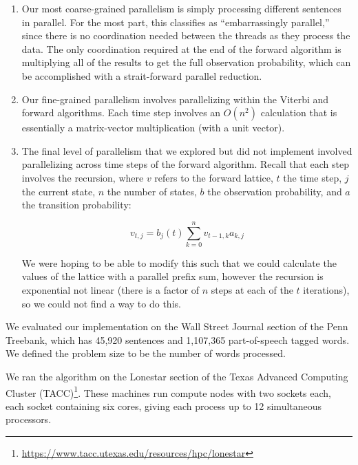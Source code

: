 \documentclass[11pt,onecolumn]{article}
\begin{document}
\begin{enumerate}
  \item Our most coarse-grained parallelism is simply processing different sentences in parallel. For the most part, this classifies as ``embarrassingly parallel,'' since there is no coordination needed between the threads as they process the data. The only coordination required at the end of the forward algorithm is multiplying all of the results to get the full observation probability, which can be accomplished with a strait-forward parallel reduction.

  \item Our fine-grained parallelism involves parallelizing within the Viterbi and forward algorithms. Each time step involves an $O(n^2)$ calculation that is essentially a matrix-vector multiplication (with a unit vector).

\item The final level of parallelism that we explored but did not implement involved parallelizing across time steps of the forward algorithm. Recall that each step involves the recursion, where $v$ refers to the forward lattice, $t$ the time step, $j$ the current state, $n$ the number of states, $b$ the observation probability, and $a$ the transition probability:

  \begin{equation}
    v_{t,j} = b_j(t) \sum_{k=0}^n v_{t - 1, k} a_{k,j}
  \end{equation}

  We were hoping to be able to modify this such that we could calculate the values of the lattice with a parallel prefix sum, however the recursion is exponential not linear (there is a factor of $n$ steps at each of the $t$ iterations), so we could not find a way to do this.

\end{enumerate}


We evaluated our implementation on the Wall Street Journal section of the Penn Treebank, which has 45,920 sentences and 1,107,365 part-of-speech tagged words. We defined the problem size to be the number of words processed.

We ran the algorithm on the Lonestar section of the Texas Advanced Computing Cluster (TACC)\footnote{\url{https://www.tacc.utexas.edu/resources/hpc/lonestar}}. These machines run compute nodes with two sockets each, each socket containing six cores, giving each process up to 12 simultaneous processors.
\end{document}
